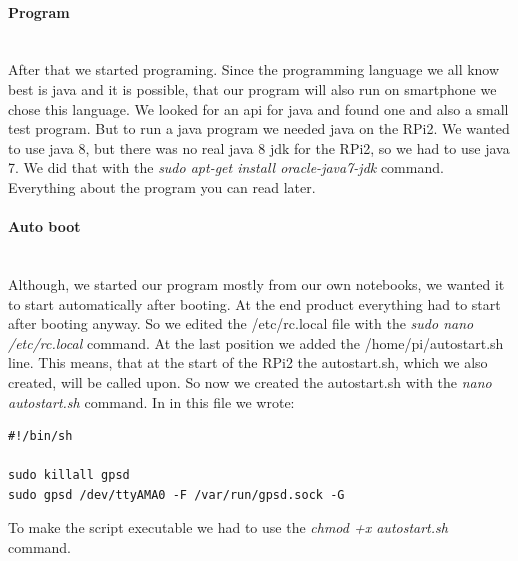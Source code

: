 \paragraph{Program} \mbox{}\\
After that we started programing. Since the programming language we all know best is java and it is possible, that our program will also run on smartphone we chose this language. \newline
We looked for an api for java and found one and also a small test program. \newline
But to run a java program we needed java on the RPi2. We wanted to use java 8, but there was no real java 8 jdk for the RPi2, so we had to use java 7. We did that with the \textit{sudo apt-get install oracle-java7-jdk} command.\newline
Everything about the program you can read later.

\paragraph{Auto boot} \mbox{}\\
Although, we started our program mostly from our own notebooks, we wanted it to start automatically after booting. At the end product everything had to start after booting anyway. So we edited the /etc/rc.local file with the \textit{sudo nano /etc/rc.local} command. At the last position we added the /home/pi/autostart.sh line.\newline
This means, that at the start of the RPi2 the autostart.sh, which we also created, will be called upon. So now we created the autostart.sh with the \textit{nano autostart.sh} command. In in this file we wrote:
\begin{verbatim}
#!/bin/sh

sudo killall gpsd
sudo gpsd /dev/ttyAMA0 -F /var/run/gpsd.sock -G
\end{verbatim}
To make the script executable we had to use the \textit{chmod +x autostart.sh} command.

